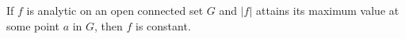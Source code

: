 If $f$ is analytic on an open connected set $G$ and $|f|$ attains its maximum value at some point $a$ in $G$, then $f$ is constant.